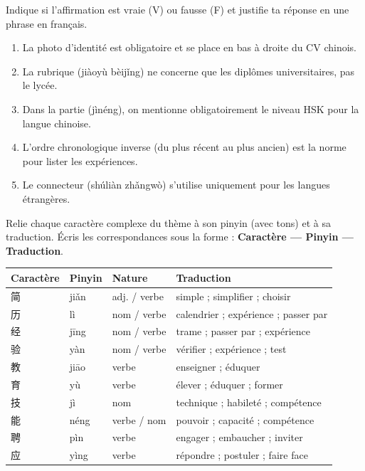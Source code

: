 \documentclass[11pt]{article}
\newcommand{\zh}[1]{\ifmmode\text{#1}\else{#1}\fi}
\begin{document}
\begin{exercice}
Indique si l'affirmation est vraie (V) ou fausse (F) et justifie ta réponse en une phrase en français.
\begin{enumerate}
    \item La photo d'identité est obligatoire et se place en bas à droite du CV chinois.
    \item La rubrique \zh{教育背景} (jiàoyù bèijǐng) ne concerne que les diplômes universitaires, pas le lycée.
    \item Dans la partie \zh{技能} (jìnéng), on mentionne obligatoirement le niveau HSK pour la langue chinoise.
    \item L'ordre chronologique inverse (du plus récent au plus ancien) est la norme pour lister les expériences.
    \item Le connecteur \zh{熟练掌握} (shúliàn zhǎngwò) s'utilise uniquement pour les langues étrangères.
\end{enumerate}
\end{exercice}

\begin{exercice}
Relie chaque caractère complexe du thème à son pinyin (avec tons) et à sa traduction. Écris les correspondances sous la forme : \textbf{Caractère — Pinyin — Traduction}.
\begin{center}
\begin{tabularx}{\linewidth}{|X|X|X|X|}
\hline
\rowcolor{popblueL} \textbf{Caractère} & \textbf{Pinyin} & \textbf{Nature} & \textbf{Traduction} \\ \hline
简 & jiǎn & adj. / verbe & simple ; simplifier ; choisir \\ \hline
历 & lì & nom / verbe & calendrier ; expérience ; passer par \\ \hline
经 & jīng & nom / verbe & trame ; passer par ; expérience \\ \hline
验 & yàn & nom / verbe & vérifier ; expérience ; test \\ \hline
教 & jiāo & verbe & enseigner ; éduquer \\ \hline
育 & yù & verbe & élever ; éduquer ; former \\ \hline
技 & jì & nom & technique ; habileté ; compétence \\ \hline
能 & néng & verbe / nom & pouvoir ; capacité ; compétence \\ \hline
聘 & pìn & verbe & engager ; embaucher ; inviter \\ \hline
应 & yìng & verbe & répondre ; postuler ; faire face \\ \hline
\end{tabularx}
\end{center}
\end{exercice}
\end{document}
